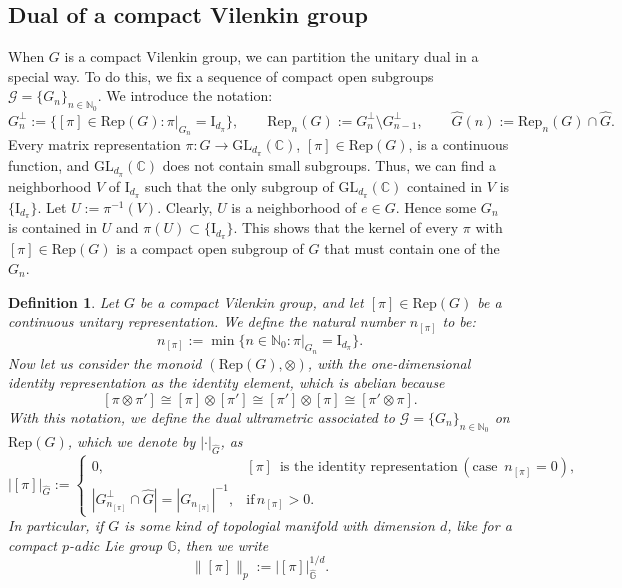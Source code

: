 \documentclass[12pt, reqno]{amsart}
\newtheorem{defi}{Definition}[section]
\newcommand{\1}{\mathds{1}}
\newcommand{\G}{\mathbb{G}}
\begin{document}
\subsection{Dual of a compact Vilenkin group}
When $G$ is a compact Vilenkin group, we can partition the unitary dual in a special way. To do this, we fix a sequence of compact open subgroups $\mathcal{G} =\{G_n\}_{n \in \mathbb{N}_0}$. We introduce the notation:
\[
G_n^\perp := \{[\pi] \in \mathrm{Rep}(G) : \pi|_{G_n} = \mathrm{I}_{d_\pi} \}, 
\qquad 
\mathrm{Rep}_n(G) := G_n^\perp \setminus G_{n-1}^\perp, 
\qquad 
\widehat{G}(n) := \mathrm{Rep}_n(G) \cap \widehat{G}.
\]
Every matrix representation $\pi : G \to \mathrm{GL}_{d_\pi}(\mathbb{C})$, $[\pi] \in \mathrm{Rep}(G)$, is a continuous function, and $\mathrm{GL}_{d_\pi}(\mathbb{C})$ does not contain small subgroups. Thus, we can find a neighborhood $V$ of $\mathrm{I}_{d_\pi}$ such that the only subgroup of $\mathrm{GL}_{d_\pi}(\mathbb{C})$ contained in $V$ is $\{\mathrm{I}_{d_\pi}\}$. Let $U := \pi^{-1}(V)$. Clearly, $U$ is a neighborhood of $e \in G$. Hence some $G_n$ is contained in $U$ and $\pi(U) \subset \{\mathrm{I}_{d_\pi}\}$. This shows that the kernel of every $\pi$ with $[\pi] \in \mathrm{Rep}(G)$ is a compact open subgroup of $G$ that must contain one of the $G_n$. 

\begin{defi}\label{defiultrametricdual}\normalfont
Let $G$ be a compact Vilenkin group, and let $[\pi] \in \mathrm{Rep}(G)$ be a continuous unitary representation. We define the natural number $n_{[\pi]}$ to be:
\[
n_{[\pi]} := \min \{ n \in \mathbb{N}_0 : \pi|_{G_n} = \mathrm{I}_{d_\pi} \}.
\]
Now let us consider the monoid $(\mathrm{Rep}(G), \otimes)$, with the one-dimensional identity representation as the identity element, which is abelian because $$[ \pi \otimes \pi' ] \cong [\pi] \otimes [\pi'] \cong [\pi'] \otimes [\pi] \cong [ \pi' \otimes \pi ] .$$With this notation, we define the \emph{dual ultrametric associated to} $\mathcal{G} =\{G_n\}_{n \in \mathbb{N}_0}$ on $\mathrm{Rep}(G)$, which we denote by $| \cdot |_{\widehat{G}}$, as
\[
|[\pi]|_{\widehat{G}} :=
\begin{cases}
0, & [\pi] \, \text{ is the identity representation} \,   ( \text{case } \, n_{[\pi]}=0),\\
|G_{n_{[\pi]}}^\bot \cap \widehat{G}| = |G_{n_{[\pi]}}|^{-1}, & \text{if} \, n_{[\pi]} > 0.
\end{cases}
\]
In particular, if $G$ is some kind of topologial manifold with dimension $d$, like for a compact $p$-adic Lie group $\G$, then we write $$ \| [\pi] \|_p:=|[\pi]|_{\widehat{\G}}^{1/d}.$$
\end{defi}
\end{document}
